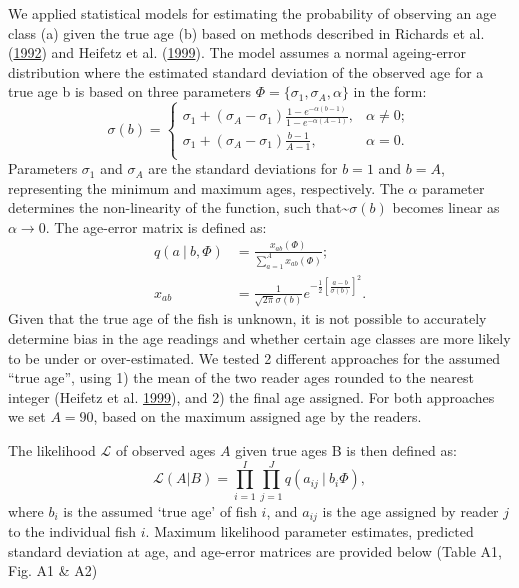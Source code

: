 \documentclass[11pt]{book}
\begin{document}
We applied statistical models for estimating the probability of observing an age class (a) given the true age (b) based on methods described in Richards et al. (\protect\hyperlink{ref-richards1992statistical}{1992}) and Heifetz et al. (\protect\hyperlink{ref-heifetz1999age}{1999}). The model assumes a normal ageing-error distribution where the estimated standard deviation of the observed age for a true age b is based on three parameters \(\Phi = \{ \sigma_1, \sigma_A, \alpha \}\) in the form:
\begin{equation}
\sigma(b) = \left\{
    \begin{array}{ll}
        \sigma_1 + (\sigma_A - \sigma_1) \frac{1 - e^{-\alpha(b - 1)} }{1 - e^{-\alpha(A - 1)}}, & \alpha \neq 0; \\
        \sigma_1 + (\sigma_A - \sigma_1) \frac{b-1}{A-1}, & \alpha = 0.\\
    \end{array} \right.
\end{equation}
Parameters \(\sigma_1\) and \(\sigma_A\) are the standard deviations for \(b=1\) and \(b=A\), representing the minimum and maximum ages, respectively. The \(\alpha\) parameter determines the non-linearity of the function, such that\textasciitilde{}\(\sigma(b)\) becomes linear as \(\alpha \rightarrow 0\). The age-error matrix is defined as:
\begin{align}
q(a ~|~ b, \Phi) &= \frac{x_{ab}(\Phi)}{\sum_{a = 1}^A x_{ab}(\Phi) }; \\
x_{ab} &= \frac{1}{\sqrt{2\pi}\sigma(b)} e^{-\frac12 \left[ \frac{a-b}{\sigma(b)} \right]^2}.
\end{align}
Given that the true age of the fish is unknown, it is not possible to accurately determine bias in the age readings and whether certain age classes are more likely to be under or over-estimated. We tested 2 different approaches for the assumed ``true age'', using 1) the mean of the two reader ages rounded to the nearest integer (Heifetz et al. \protect\hyperlink{ref-heifetz1999age}{1999}), and 2) the final age assigned. For both approaches we set \(A=90\), based on the maximum assigned age by the readers.

The likelihood \(\mathcal{L}\) of observed ages \(A\) given true ages B is then defined as:
\begin{equation}
\mathcal{L}(A|B) = \prod_{i = 1}^I \prod_{j = 1}^J q(a_{ij} ~|~ b_i \Phi),
\end{equation}
where \(b_i\) is the assumed `true age' of fish \(i\), and \(a_{ij}\) is the age assigned by reader \(j\) to the individual fish \(i\). Maximum likelihood parameter estimates, predicted standard deviation at age, and age-error matrices are provided below (Table A1, Fig. A1 \& A2)
\end{document}
